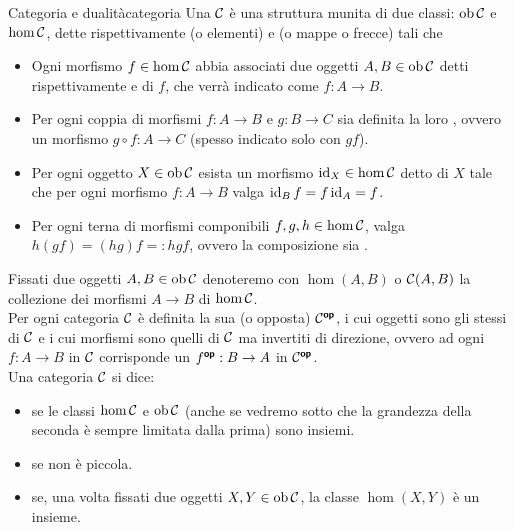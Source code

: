 \documentclass{article}
\renewcommand\C{\mc{C}}
\begin{document}
\begin{definition}{Categoria e dualità}{categoria}
    Una  $\C$ è una struttura munita di due classi: $\ob\C$ e $\hom\C$, dette rispettivamente  (o elementi) e  (o mappe o frecce) tali che \begin{itemize}
        \item Ogni morfismo $f \in \hom\C$ abbia associati due oggetti $A,B \in \ob\C$ detti rispettivamente  e  di $f$, che verrà indicato come $f : A\to B$.
        \item Per ogni coppia di morfismi $f:A\to B$ e $g : B\to C$ sia definita la loro , ovvero un morfismo $g\circ f : A \to C$ (spesso indicato solo con $gf$).
        \item Per ogni oggetto $X \in \ob\C$ esista un morfismo $\id_X \in \hom\C$ detto  di $X$ tale che per ogni morfismo $f:A\to B$ valga $\operatorname{id}_B f = f \operatorname{id}_A = f$.
        \item Per ogni terna di morfismi componibili $f,g,h \in \hom\C$, valga $h(gf) = (hg)f =: hgf$, ovvero la composizione sia .
    \end{itemize}
    Fissati due oggetti $A,B \in \ob\C$ denoteremo con $\hom(A,B)$ o $\C(A,B)$ la collezione dei morfismi $A\to B$ di $\hom\C$.\\
    Per ogni categoria $\C$ è definita la sua  (o opposta) $\C^\op$, i cui oggetti sono gli stessi di $\C$ e i cui morfismi sono quelli di $\C$ ma invertiti di direzione, ovvero ad ogni $f:A\to B$ in $\C$ corrisponde un $f^{\text{\sffamily\textbf{op}}} : B\to A$ in $\C^\op$.\\
    Una categoria $\C$ si dice:\begin{itemize}
        \item {} se le classi $\hom\C$ e $\ob\C$ (anche se vedremo sotto che la grandezza della seconda è sempre limitata dalla prima) sono insiemi.
        \item {} se non è piccola.
        \item {} se, una volta fissati due oggetti $X,Y \in \ob\C$, la classe $\hom(X,Y)$ è un insieme.
    \end{itemize}
\end{definition}
\end{document}
